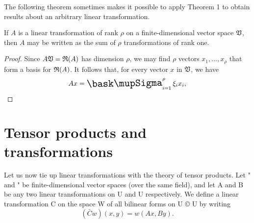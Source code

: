 The following theorem sometimes makes it possible to apply Theorem 1 to obtain
results about an arbitrary linear transformation.

\begin{theorem}
    If \(A\) is a linear transformation of rank \(\rho\) on a finite-dimensional vector space \(\mathfrak{V}\), then \(A\) may be written as the sum of \(\rho\) transformations of rank one.
\end{theorem}

\begin{proof}
    Since \(A\mathfrak{V} = \frak{R}(A)\) has dimension \(\rho\), we may find \(\rho\) vectors \(x_1, \ldots, x_{\rho}\) that form a basis for \(\frak{R}(A)\). It follows that, for every vector \(x\) in \(\mathfrak{V}\), we have
    \begin{equation*}
        Ax = \sumx_{i=1}^{\rho} \xi_i x_i,
    \end{equation*}
\end{proof}

\section{Tensor products and transformations}

Let us now tie up linear transformations with the theory of tensor products. Let " and " be finite-dimensional vector spaces (over the same field), and let A and B be any two linear transformations on U and U respectively. We define a linear transformation C on the space W of all bilinear forms on U © U by writing
\begin{equation*}
    (\bar{C}w)(x, y) = w(Ax, By).
\end{equation*}

